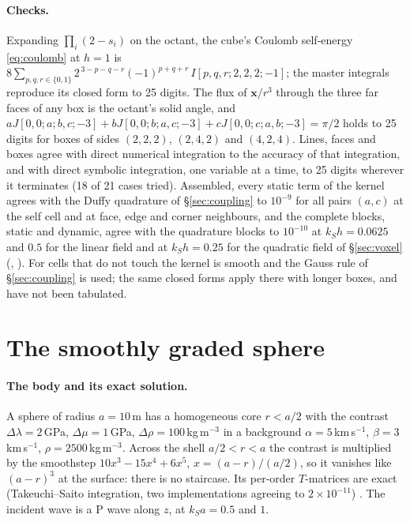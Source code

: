 \documentclass[11pt,a4paper]{article}
\begin{document}
\paragraph{Checks.} Expanding $\prod_i(2-s_i)$ on the octant, the cube's Coulomb self-energy
\eqref{eq:coulomb} at $h=1$ is
$8\sum_{p,q,r\in\{0,1\}}2^{\,3-p-q-r}(-1)^{p+q+r}\,I[p,q,r;2,2,2;-1]$; the master integrals reproduce its
closed form to 25 digits. The flux of
$\mathbf{x}/r^3$ through the three far faces of any box is the octant's solid angle, and
$aJ[0,0;a;b,c;-3]+bJ[0,0;b;a,c;-3]+cJ[0,0;c;a,b;-3]=\pi/2$ holds to 25 digits for boxes of sides
$(2,2,2)$, $(2,4,2)$ and $(4,2,4)$. Lines, faces and boxes agree with direct numerical integration to
the accuracy of that integration, and with direct symbolic integration, one variable at a time, to 25
digits wherever it terminates (18 of 21 cases tried). Assembled, every static term of the kernel agrees
with the Duffy quadrature of \S\ref{sec:coupling} to $10^{-9}$ for all pairs $(a,c)$ at the self cell and
at face, edge and corner neighbours, and the complete blocks, static and dynamic, agree with the
quadrature blocks to $10^{-10}$ at $k_Sh=0.0625$ and $0.5$ for the linear field and at $k_Sh=0.25$ for the
quadratic field of \S\ref{sec:voxel} (,
). For cells that do not touch the kernel is smooth and the Gauss rule of
\S\ref{sec:coupling} is used; the same closed forms apply there with longer boxes, and have not been
tabulated.

\section{The smoothly graded sphere}\label{sec:sphere}

\paragraph{The body and its exact solution.} A sphere of radius $a=10$\,m has a homogeneous core
$r<a/2$ with the contrast $\Delta\lambda=2$\,GPa, $\Delta\mu=1$\,GPa, $\Delta\rho=100$\,kg\,m$^{-3}$ in a
background $\alpha=5$\,km\,s$^{-1}$, $\beta=3$\,km\,s$^{-1}$, $\rho=2500$\,kg\,m$^{-3}$. Across the shell
$a/2<r<a$ the contrast is multiplied by the smoothstep $10x^3-15x^4+6x^5$, $x=(a-r)/(a/2)$, so it vanishes
like $(a-r)^3$ at the surface: there is no staircase. Its per-order $T$-matrices are exact (Takeuchi--Saito
integration, two implementations agreeing to $2\times10^{-11}$) \citep{NestorError2026}. The incident
wave is a P wave along $z$, at $k_Sa=0.5$ and $1$.
\end{document}
